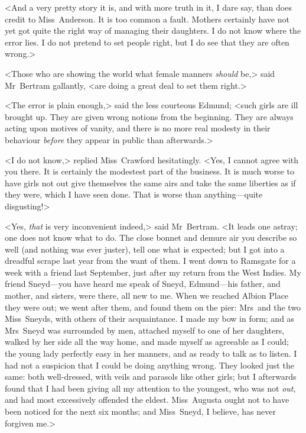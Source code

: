 <And a very pretty story it is, and with more truth in it, I dare say, than does credit to Miss~Anderson. It is too common a fault. Mothers certainly have not yet got quite the right way of managing their daughters. I do not know where the error lies. I do not pretend to set people right, but I do see that they are often wrong.>

<Those who are showing the world what female manners \textit{should}  be,> said Mr~Bertram gallantly, <are doing a great deal to set them right.>

<The error is plain enough,> said the less courteous Edmund; <such girls are ill brought up. They are given wrong notions from the beginning. They are always acting upon motives of vanity, and there is no more real modesty in their behaviour \textit{before}  they appear in public than afterwards.>

<I do not know,> replied Miss~Crawford hesitatingly. <Yes, I cannot agree with you there. It is certainly the modestest part of the business. It is much worse to have girls not out give themselves the same airs and take the same liberties as if they were, which I have seen done. That is worse than anything—quite disgusting!>

<Yes, \textit{that}  is very inconvenient indeed,> said Mr~Bertram. <It leads one astray; one does not know what to do. The close bonnet and demure air you describe so well (and nothing was ever juster), tell one what is expected; but I got into a dreadful scrape last year from the want of them. I went down to Ramsgate for a week with a friend last September, just after my return from the West Indies. My friend Sneyd—you have heard me speak of Sneyd, Edmund—his father, and mother, and sisters, were there, all new to me. When we reached Albion Place they were out; we went after them, and found them on the pier: Mrs~and the two Miss~Sneyds, with others of their acquaintance. I made my bow in form; and as Mrs~Sneyd was surrounded by men, attached myself to one of her daughters, walked by her side all the way home, and made myself as agreeable as I could; the young lady perfectly easy in her manners, and as ready to talk as to listen. I had not a suspicion that I could be doing anything wrong. They looked just the same: both well-dressed, with veils and parasols like other girls; but I afterwards found that I had been giving all my attention to the youngest, who was not \textit{out}, and had most excessively offended the eldest. Miss~Augusta ought not to have been noticed for the next six months; and Miss~Sneyd, I believe, has never forgiven me.>


